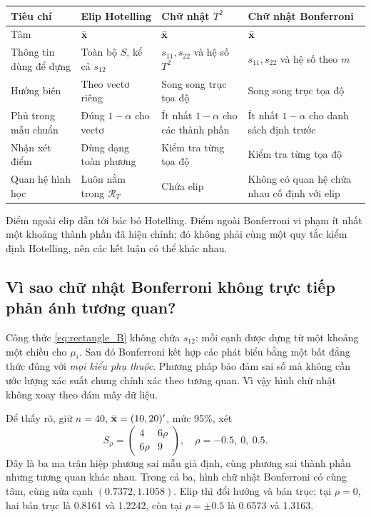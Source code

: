 \begin{center}
\small
\begin{tabular}{L{.21\linewidth}L{.22\linewidth}L{.23\linewidth}L{.23\linewidth}}
\toprule
Tiêu chí & Elip Hotelling & Chữ nhật $T^2$ & Chữ nhật Bonferroni\\
\midrule
Tâm & $\bar{\mathbf x}$ & $\bar{\mathbf x}$ & $\bar{\mathbf x}$\\[3pt]
Thông tin dùng để dựng & Toàn bộ $S$, kể cả $s_{12}$ & $s_{11},s_{22}$ và hệ số $T^2$ & $s_{11},s_{22}$ và hệ số theo $m$\\[3pt]
Hướng biên & Theo vectơ riêng & Song song trục tọa độ & Song song trục tọa độ\\[3pt]
Phủ trong mẫu chuẩn & Đúng $1-\alpha$ cho vectơ & Ít nhất $1-\alpha$ cho các thành phần & Ít nhất $1-\alpha$ cho danh sách định trước\\[3pt]
Nhận xét điểm & Dùng dạng toàn phương & Kiểm tra từng tọa độ & Kiểm tra từng tọa độ\\[3pt]
Quan hệ hình học & Luôn nằm trong $\mathcal R_T$ & Chứa elip & Không có quan hệ chứa nhau cố định với elip\\
\bottomrule
\end{tabular}
\end{center}
Điểm ngoài elip dẫn tới bác bỏ Hotelling. Điểm ngoài Bonferroni vi phạm
ít nhất một khoảng thành phần đã hiệu chỉnh; đó không phải cùng một
quy tắc kiểm định Hotelling, nên các kết luận có thể khác nhau.

\subsection{Vì sao chữ nhật Bonferroni không trực tiếp phản ánh tương quan?}
\label{sec:bonf_correlation}
Công thức \eqref{eq:rectangle_B} không chứa $s_{12}$: mỗi cạnh được dựng
từ một khoảng một chiều cho $\mu_i$. Sau đó Bonferroni kết hợp các
phát biểu bằng một bất đẳng thức đúng với \emph{mọi kiểu phụ thuộc}.
Phương pháp bảo đảm sai số mà không cần ước lượng xác suất chung chính
xác theo tương quan. Vì vậy hình chữ nhật không xoay theo đám mây dữ liệu.

Để thấy rõ, giữ $n=40$, $\bar{\mathbf x}=(10,20)'$, mức 95\%, xét
\begin{equation}
 S_\rho=\begin{pmatrix}4&6\rho\\6\rho&9\end{pmatrix},\quad
 \rho=-0.5,\ 0,\ 0.5.
 \label{eq:covariance_family}
\end{equation}
Đây là ba ma trận hiệp phương sai mẫu giả định, cùng phương sai thành
phần nhưng tương quan khác nhau. Trong cả ba, hình chữ nhật Bonferroni
có cùng tâm, cùng nửa cạnh $(0.7372,1.1058)$.
Elip thì đổi hướng và bán trục; tại $\rho=0$, hai bán trục là 0.8161
và 1.2242, còn tại $\rho=\pm0.5$ là 0.6573 và 1.3163.

